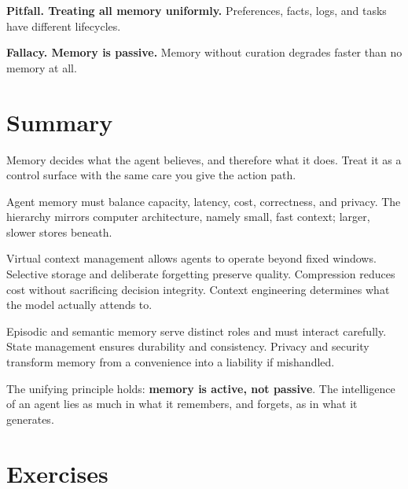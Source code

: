 \textbf{Pitfall. Treating all memory uniformly.}
Preferences, facts, logs, and tasks have different lifecycles.

\textbf{Fallacy. Memory is passive.}
Memory without curation degrades faster than no memory at all.

\section{Summary}

Memory decides what the agent believes, and therefore what it does. Treat it as a
control surface with the same care you give the action path.

Agent memory must balance capacity, latency, cost, correctness, and privacy. The hierarchy mirrors computer architecture, namely small, fast context; larger, slower stores beneath.

Virtual context management allows agents to operate beyond fixed windows. Selective storage and deliberate forgetting preserve quality. Compression reduces cost without sacrificing decision integrity. Context engineering determines what the model actually attends to.

Episodic and semantic memory serve distinct roles and must interact carefully. State management ensures durability and consistency. Privacy and security transform memory from a convenience into a liability if mishandled.

The unifying principle holds: \textbf{memory is active, not passive}. The intelligence of an agent lies as much in what it remembers, and forgets, as in what it generates.

\section*{Exercises}

